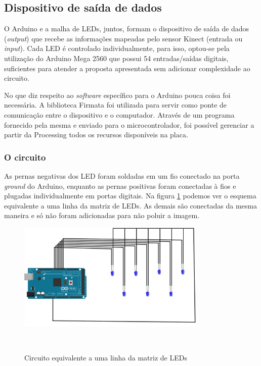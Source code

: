 \subsection{\textbf{Dispositivo de saída de dados}}

O Arduino e a malha de LEDs, juntos, formam o dispositivo de saída de dados (\textit{output}) que recebe as informações mapeadas pelo sensor Kinect (entrada ou \textit{input}). Cada LED é controlado individualmente, para isso, optou-se pela utilização do Arduino Mega 2560 que possui 54 entradas/saídas digitais, suficientes para atender a proposta apresentada sem adicionar complexidade ao circuito.


No que diz respeito ao \textit{software} específico para o Arduino pouca coisa foi necessária. A biblioteca Firmata foi utilizada para servir como ponte de comunicação entre o dispositivo e o computador. Através de um programa fornecido pela mesma e enviado para o microcontrolador, foi possível gerenciar a partir da Processing todos os recursos disponíveis na placa.

\subsubsection{O circuito}

As pernas negativas dos LED foram soldadas em um fio conectado na porta \textit{ground} do Arduino, enquanto as pernas positivas foram conectadas à fios e plugadas individualmente em portas digitais. Na figura \ref{fig:breadboard} podemos ver o esquema equivalente a uma linha da matriz de LEDs. As demais são conectadas da mesma maneira e só não foram adicionadas para não poluir a imagem.

\begin{figure}[H]
  \begin{center}
    \caption{Circuito equivalente a uma linha da matriz de LEDs}
    \vspace*{0,2cm}
    \includegraphics[width=0.8\textwidth]{./04-figuras/breadboard}
    \label{fig:breadboard}
  \end{center}
  \vspace*{-0,9cm}
  \\
\end{figure}

